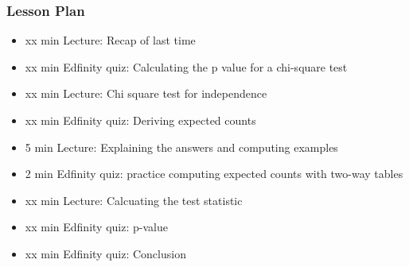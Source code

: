 \begin{frame}
    \frametitle{Lesson Plan}
    \begin{itemize}
        \item xx min Lecture: Recap of last time
        \item xx min Edfinity quiz: Calculating the p value for a chi-square test
        \item xx min Lecture: Chi square test for independence
        \item xx min Edfinity quiz: Deriving expected counts
        \item 5 min Lecture: Explaining the answers and computing examples
        \item 2 min Edfinity quiz: practice computing expected counts with two-way tables
        \item xx min Lecture: Calcuating the test statistic
        \item xx min Edfinity quiz: p-value
        \item xx min Edfinity quiz: Conclusion
        
    \end{itemize}
\end{frame}
            
   
